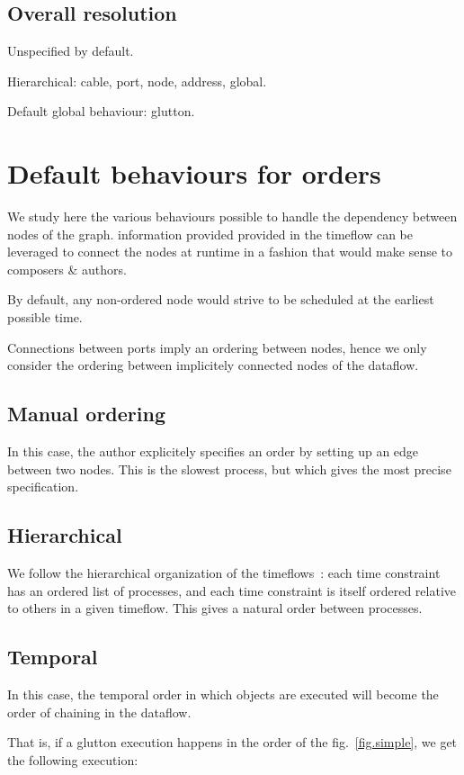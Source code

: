 \documentclass{article}
\begin{document}
    \subsection{Overall resolution}
    Unspecified by default. 
    
    Hierarchical: cable, port, node, address, global.
    
    Default global behaviour: glutton.
    
  
    \section{Default behaviours for orders}
    \label{sec.order}
    We study here the various behaviours possible to handle the dependency between nodes of the graph.
    information provided provided in the timeflow can be leveraged to connect the nodes at runtime in a fashion 
    that would make sense to composers \& authors.
    
    By default, any non-ordered node would strive to be scheduled at the earliest possible time.
    
    Connections between ports imply an ordering between nodes, hence we only consider the ordering between implicitely connected nodes of the dataflow.
    
    \subsection{Manual ordering}
    In this case, the author explicitely specifies an order by setting up an edge between two nodes. 
    This is the slowest process, but which gives the most precise specification.
    
    \subsection{Hierarchical}
    We follow the hierarchical organization of the timeflows~: each time constraint has an ordered list of processes, and each time constraint is itself ordered relative to others in a given timeflow. 
    This gives a natural order between processes.
    
    \subsection{Temporal}
    In this case, the temporal order in which objects are executed
    will become the order of chaining in the dataflow.
    
    That is, if a glutton execution happens in the order of the fig.~\ref{fig.simple}, we get the following execution: 
    
\end{document}
